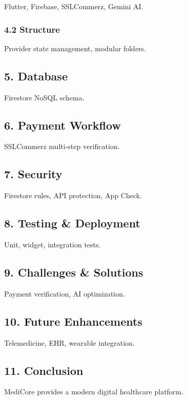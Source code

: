 \documentclass[
]{article}
\begin{document}
Flutter, Firebase, SSLCommerz, Gemini AI.

\hypertarget{structure}{%
\subsubsection{4.2 Structure}\label{structure}}

Provider state management, modular folders.

\hypertarget{database}{%
\subsection{5. Database}\label{database}}

Firestore NoSQL schema.

\hypertarget{payment-workflow}{%
\subsection{6. Payment Workflow}\label{payment-workflow}}

SSLCommerz multi‑step verification.

\hypertarget{security}{%
\subsection{7. Security}\label{security}}

Firestore rules, API protection, App Check.

\hypertarget{testing-deployment}{%
\subsection{8. Testing \& Deployment}\label{testing-deployment}}

Unit, widget, integration tests.

\hypertarget{challenges-solutions}{%
\subsection{9. Challenges \& Solutions}\label{challenges-solutions}}

Payment verification, AI optimization.

\hypertarget{future-enhancements}{%
\subsection{10. Future Enhancements}\label{future-enhancements}}

Telemedicine, EHR, wearable integration.

\hypertarget{conclusion}{%
\subsection{11. Conclusion}\label{conclusion}}

MediCore provides a modern digital healthcare platform.
\end{document}

